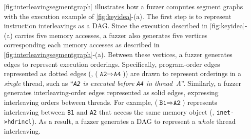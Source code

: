 %



%
%
\autoref{fig:interleavingsegmentgraph} illustrates how a fuzzer 
computes segment graphs with the execution example of
\autoref{fig:keyidea}-(a).
%
The first step is to represent instruction interleavings as a DAG. Since the
execution described in \autoref{fig:keyidea}-(a) carries five memory
accesses, a fuzzer also generates five vertices corresponding each
memory accesses as described in
\autoref{fig:interleavingsegmentgraph}-(a).
%
Between these vertices, a fuzzer generates edges to represent
execution orderings. Specifically, program-order edges represented as
dotted edges (\eg, ($\texttt{A2} \Rightarrow \texttt{A4}$)) are drawn
to represent orderings in a \textit{single} thread, such as
``\textit{\texttt{A2} is executed before \texttt{A4} in thread~A}''.
%
Similarly, a fuzzer generates interleaving-order edges represented as
solid edges, expressing interleaving orders between threads. For
example, ($\texttt{B1} \Rightarrow \texttt{A2}$) represents
interleaving between \texttt{B1} and \texttt{A2} that access the same
memory object (\ie, \texttt{inet->hdrincl}).
%
As a result, a fuzzer generates a DAG to represent a \textit{whole}
thread interleaving.



